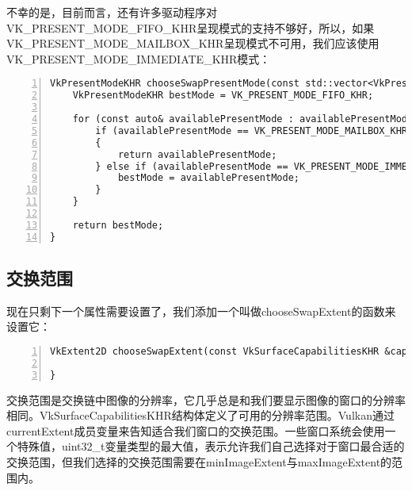 \documentclass{ctexart}
\begin{document}
不幸的是，目前而言，还有许多驱动程序对VK\_PRESENT\_MODE\_FIFO\_KHR呈现模式的支持不够好，所以，如果VK\_PRESENT\_MODE\_MAILBOX\_KHR呈现模式不可用，我们应该使用VK\_PRESENT\_MODE\_IMMEDIATE\_KHR模式：

\begin{lstlisting}[language={[ANSI]C},keywordstyle=\color{blue!70},commentstyle=\color{red!50!green!50!blue!50},frame=shadowbox, rulesepcolor=\color{red!20!green!20!blue!20},basicstyle=\small,numbers=left, numberstyle=\tiny,breaklines=true]
VkPresentModeKHR chooseSwapPresentMode(const std::vector<VkPresentModeKHR> availablePresentModes) {
	VkPresentModeKHR bestMode = VK_PRESENT_MODE_FIFO_KHR;

	for (const auto& availablePresentMode : availablePresentModes) {
		if (availablePresentMode == VK_PRESENT_MODE_MAILBOX_KHR)
		{
			return availablePresentMode;
		} else if (availablePresentMode == VK_PRESENT_MODE_IMMEDIATE_KHR) {
			bestMode = availablePresentMode;
		}
	}

	return bestMode;
}
\end{lstlisting}

\subsection{交换范围}

现在只剩下一个属性需要设置了，我们添加一个叫做chooseSwapExtent的函数来设置它：

\begin{lstlisting}[language={[ANSI]C},keywordstyle=\color{blue!70},commentstyle=\color{red!50!green!50!blue!50},frame=shadowbox, rulesepcolor=\color{red!20!green!20!blue!20},basicstyle=\small,numbers=left, numberstyle=\tiny,breaklines=true]
VkExtent2D chooseSwapExtent(const VkSurfaceCapabilitiesKHR &capabilities) {

}
\end{lstlisting}

交换范围是交换链中图像的分辨率，它几乎总是和我们要显示图像的窗口的分辨率相同。VkSurfaceCapabilitiesKHR结构体定义了可用的分辨率范围。Vulkan通过currentExtent成员变量来告知适合我们窗口的交换范围。一些窗口系统会使用一个特殊值，uint32\_t变量类型的最大值，表示允许我们自己选择对于窗口最合适的交换范围，但我们选择的交换范围需要在minImageExtent与maxImageExtent的范围内。
\end{document}
